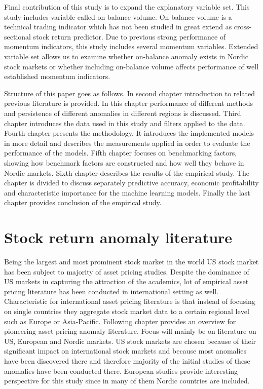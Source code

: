 \documentclass{article}
\begin{document}
Final contribution of this study is to expand the explanatory variable set. This study includes variable called on-balance volume. On-balance volume is a technical trading indicator which has not been studied in great extend as cross-sectional stock return predictor. Due to previous strong performance of momentum indicators, this study includes several momentum variables. Extended variable set allows us to examine whether on-balance anomaly exists in Nordic stock markets or whether including on-balance volume affects performance of well established momentum indicators. \par

Structure of this paper goes as follows. In second chapter introduction to related previous literature is provided. In this chapter performance of different methods and persistence of different anomalies in different regions is discussed. Third chapter introduces the data used in this study and filters applied to the data. Fourth chapter presents the methodology. It introduces the implemented models in more detail and describes the measurements applied in order to evaluate the performance of the models. Fifth chapter focuses on benchmarking factors, showing how benchmark factors are constructed and how well they behave in Nordic markets. Sixth chapter describes the results of the empirical study. The chapter is divided to discuss separately predictive accuracy, economic profitability and characteristic importance for the machine learning models. Finally the last chapter provides conclusion of the empirical study. \par

\section{Stock return anomaly literature}\label{StockReturnAnomalyLiterature}

Being the largest and most prominent stock market in the world US stock market has been subject to majority of asset pricing studies. Despite the dominance of US markets in capturing the attraction of the academics, lot of empirical asset pricing literature has been conducted in international setting as well. Characteristic for international asset pricing literature is that instead of focusing on single countries they aggregate stock market data to a certain regional level such as Europe or Asia-Pacific. Following chapter provides an overview for pioneering asset pricing anomaly literature. Focus will mainly be on literature on US, European and Nordic markets. US stock markets are chosen because of their significant impact on international stock markets and because most anomalies have been discovered there and therefore majority of the initial studies of these anomalies have been conducted there. European studies provide interesting perspective for this study since in many of them Nordic countries are included. \par
\end{document}
